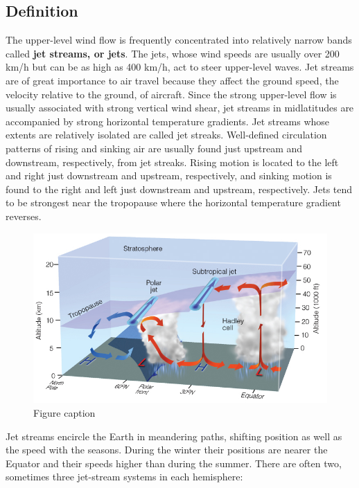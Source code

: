 \documentclass[12pt,oneside]{book}
\begin{document}
\subsection{Definition}\label{definition}

The upper-level wind flow is frequently concentrated into relatively
narrow bands called \textbf{jet streams, or jets}. The jets, whose wind
speeds are usually over 200 km/h but can be as high as 400 km/h, act to
steer upper-level waves. Jet streams are of great importance to air
travel because they affect the ground speed, the velocity relative to
the ground, of aircraft. Since the strong upper-level flow is usually
associated with strong vertical wind shear, jet streams in midlatitudes
are accompanied by strong horizontal temperature gradients. Jet streams
whose extents are relatively isolated are called jet streaks.
Well-defined circulation patterns of rising and sinking air are usually
found just upstream and downstream, respectively, from jet streaks.
Rising motion is located to the left and right just downstream and
upstream, respectively, and sinking motion is found to the right and
left just downstream and upstream, respectively. Jets tend to be
strongest near the tropopause where the horizontal temperature gradient
reverses.

\begin{figure}

{\centering \includegraphics[width=0.8\linewidth]{figures/Figure521a} 

}

\caption{Figure caption}\label{fig:Fig521a}
\end{figure}

Jet streams encircle the Earth in meandering paths, shifting position as
well as the speed with the seasons. During the winter their positions
are nearer the Equator and their speeds higher than during the summer.
There are often two, sometimes three jet-stream systems in each
hemisphere:
\end{document}
